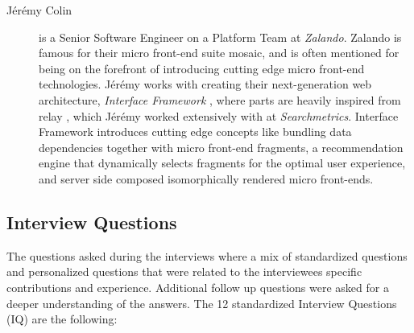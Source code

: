 \begin{description}
    \item[J\'er\'emy Colin] is a Senior Software Engineer on a Platform Team at \textit{Zalando}. Zalando is famous for their micro front-end suite mosaic, and is often mentioned for being on the forefront of introducing cutting edge micro front-end technologies. J\'er\'emy works with creating their next-generation web architecture, \textit{Interface Framework} \cite{Colin2018}, where parts are heavily inspired from relay \cite{FacebookInc.a}, which J\'er\'emy worked extensively with at \textit{Searchmetrics}. Interface Framework introduces cutting edge concepts like bundling data dependencies together with micro front-end fragments, a recommendation engine that dynamically selects fragments for the optimal user experience, and server side composed isomorphically rendered micro front-ends.
\end{description}

\subsection{Interview Questions}

The questions asked during the interviews where a mix of standardized questions and personalized questions that were related to the interviewees specific contributions and experience. Additional follow up questions were asked for a deeper understanding of the answers. The 12 standardized Interview Questions (IQ) are the following:

